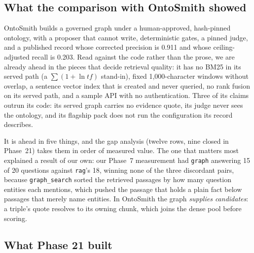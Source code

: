 \subsection{What the comparison with OntoSmith showed}

OntoSmith builds a governed graph under a human-approved, hash-pinned ontology, with a proposer that cannot write, deterministic gates, a pinned judge, and a
published record whose corrected precision is 0.911 and whose ceiling-adjusted recall is 0.203. Read against the code rather than the prose, we are already
ahead in the pieces that decide retrieval quality: it has no BM25 in its served path (a $\sum(1+\ln tf)$ stand-in), fixed 1,000-character windows without
overlap, a sentence vector index that is created and never queried, no rank fusion on its served path, and a sample API with no authentication. Three of
its claims outrun its code: its served graph carries no evidence quote, its judge never sees the ontology, and its flagship pack does not run the
configuration its record describes.

It is ahead in five things, and the gap analysis (twelve rows, nine closed in Phase~21) takes them in order of measured value. The one that matters most
explained a result of our own: our Phase~7 measurement had \texttt{graph} answering 15 of 20 questions against \texttt{rag}'s 18, winning none of the three
discordant pairs, because \texttt{graph\_search} sorted the retrieved passages by how many question entities each mentions, which pushed the passage that
holds a plain fact below passages that merely name entities. In OntoSmith the graph \emph{supplies candidates}: a triple's quote resolves to its owning chunk,
which joins the dense pool before scoring.

\subsection{What Phase 21 built}

